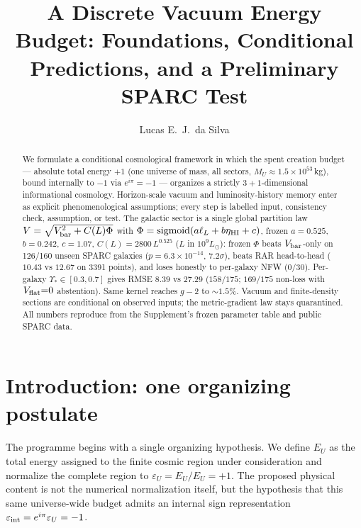 \documentclass[twocolumn]{aastex631}
\begin{document}
\title{A Discrete Vacuum Energy Budget: Foundations, Conditional Predictions, and a Preliminary SPARC Test}

\author{Lucas E.~J.~da Silva}




\begin{abstract}
We formulate a conditional cosmological framework in which the spent creation budget --- absolute total energy $+1$ (one universe of mass, all sectors, $M_U\approx1.5\times10^{53}$\,kg), bound internally to $-1$ via $e^{i\pi}=-1$ --- organizes a strictly $3+1$-dimensional informational cosmology. Horizon-scale vacuum and luminosity-history memory enter as explicit phenomenological assumptions; every step is labelled input, consistency check, assumption, or test. The galactic sector is a single global partition law $V=\sqrt{V_{\rm bar}^2+C(L)\Phi}$ with $\Phi={\rm sigmoid}(a\ell_L+b\eta_{\rm HI}+c)$, frozen $a=0.525$, $b=0.242$, $c=1.07$, $C(L)=2800\,L^{0.525}$ ($L$ in $10^9L_\odot$): frozen $\Phi$ beats $V_{\rm bar}$-only on 126/160 unseen SPARC galaxies ($p=6.3\times10^{-14}$, $7.2\sigma$), beats RAR \cite{RAR2016} head-to-head ($10.43$ vs $12.67$ on 3391 points), and loses honestly to per-galaxy NFW \cite{Katz2017} ($0/30$). Per-galaxy $\Upsilon_*\in[0.3,0.7]$ \cite{Meidt2014} gives RMSE $8.39$ vs $27.29$ ($158/175$; $169/175$ non-loss with $V_{\rm flat}{=}0$ abstention). Same kernel reaches $g-2$ \cite{PDG2024,Muong22023} to $\sim1.5\%$. Vacuum and finite-density sections are conditional on observed inputs; the metric-gradient law stays quarantined. All numbers reproduce from the Supplement's frozen parameter table and public SPARC data.
\end{abstract}


\section{Introduction: one organizing postulate}

The programme begins with a single organizing hypothesis. We define $E_U$ as the total energy assigned to the finite cosmic region under consideration and normalize the complete region to $\varepsilon_U=E_U/E_U=+1$. The proposed physical content is not the numerical normalization itself, but the hypothesis that this same universe-wide budget admits an internal sign representation $\varepsilon_{\rm int}=e^{i\pi}\varepsilon_U=-1$.
\end{document}
